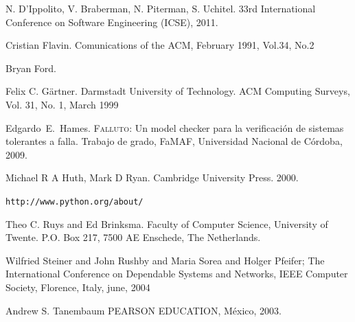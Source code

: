 \documentclass[pdftex,a4paper,12pt]{book}
\begin{document}
\begin{thebibliography}{99}
N. D'Ippolito, V. Braberman, N. Piterman, S. Uchitel.
\newblock 33rd International Conference on Software Engineering (ICSE), 2011.


Cristian Flavin.
\newblock Comunications of the ACM, February 1991, Vol.34, No.2


Bryan Ford.


Felix C. G\"{a}rtner.
\newblock Darmstadt University of Technology. ACM Computing Surveys, Vol. 31, No. 1, March 1999


Edgardo~E.\ Hames.
\newblock \textsc{Falluto}: {U}n model checker para la verificaci\'on de
  sistemas tolerantes a falla.
\newblock Trabajo de grado, FaMAF, Universidad Nacional de C\'ordoba, 2009.


Michael R A Huth, Mark D Ryan.
\newblock Cambridge University Press. 2000.


\newblock \texttt{http://www.python.org/about/}


Theo C. Ruys and Ed Brinksma.
\newblock Faculty of Computer Science, University of Twente. P.O. Box 217, 7500 AE Enschede, The Netherlands.


Wilfried Steiner and John Rushby and Maria Sorea and Holger Pfeifer;
\newblock The International Conference on Dependable Systems and Networks, IEEE Computer Society, Florence, Italy, june, 2004


Andrew S. Tanembaum
\newblock PEARSON EDUCATION, M\'exico, 2003.

\end{thebibliography}
\end{document}
